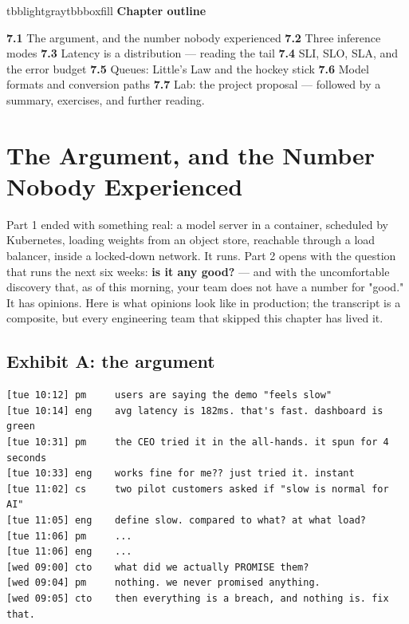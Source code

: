 \vspace{3.5pt}

\begin{calloutbox}{tbblightgray}{tbbboxfill}
{\normalsize\bfseries\color{tbbink}Chapter outline}\par\vspace{3pt}
\textbf{7.1} The argument, and the number nobody experienced    \textbf{7.2} Three inference modes    \textbf{7.3} Latency is a distribution — reading the tail    \textbf{7.4} SLI, SLO, SLA, and the error budget    \textbf{7.5} Queues: Little's Law and the hockey stick    \textbf{7.6} Model formats and conversion paths    \textbf{7.7} Lab: the project proposal — followed by a summary, exercises, and further reading.
\end{calloutbox}

\section{The Argument, and the Number Nobody Experienced}

Part 1 ended with something real: a model server in a container, scheduled by Kubernetes, loading weights from an object store, reachable through a load balancer, inside a locked-down network. It runs. Part 2 opens with the question that runs the next six weeks: \textbf{is it any good?} — and with the uncomfortable discovery that, as of this morning, your team does not have a number for "good." It has opinions. Here is what opinions look like in production; the transcript is a composite, but every engineering team that skipped this chapter has lived it.

\subsection*{Exhibit A: the argument}

\begin{terminalbox}
\begin{Verbatim}[breaklines=true,breakanywhere=true,fontsize=\small,formatcom=\color{tbbtermfg},codes=\tbbcodeactive]
[tue 10:12] pm     users are saying the demo "feels slow"
[tue 10:14] eng    avg latency is 182ms. that's fast. dashboard is green
[tue 10:31] pm     the CEO tried it in the all-hands. it spun for 4 seconds
[tue 10:33] eng    works fine for me?? just tried it. instant
[tue 11:02] cs     two pilot customers asked if "slow is normal for AI"
[tue 11:05] eng    define slow. compared to what? at what load?
[tue 11:06] pm     ...
[tue 11:06] eng    ...
[wed 09:00] cto    what did we actually PROMISE them?
[wed 09:04] pm     nothing. we never promised anything.
[wed 09:05] cto    then everything is a breach, and nothing is. fix that.
\end{Verbatim}
\end{terminalbox}

